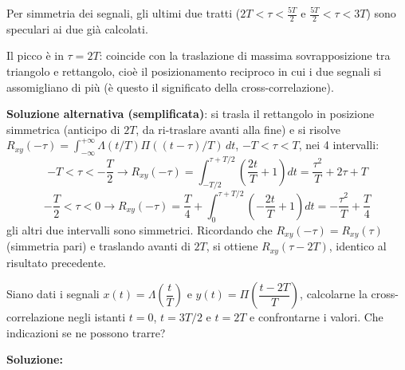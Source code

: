 \documentclass[12pt, a4paper]{article}
\begin{document}
Per simmetria dei segnali, gli ultimi due tratti ($2T<\tau<\frac{5T}2$ e $\frac{5T}2<\tau<3T$) sono speculari ai due già calcolati.

\begin{center}
\end{center}

Il picco è in $\tau=2T$: coincide con la traslazione di massima sovrapposizione tra triangolo e rettangolo, cioè il posizionamento reciproco in cui i due segnali si assomigliano di più (è questo il significato della cross-correlazione).

\textbf{Soluzione alternativa (semplificata)}: si trasla il rettangolo in posizione simmetrica (anticipo di $2T$, da ri-traslare avanti alla fine) e si risolve $R_{xy}(-\tau)=\int_{-\infty}^{+\infty}\Lambda(t/T)\Pi((t-\tau)/T)\,dt$, $-T<\tau<T$, nei 4 intervalli:
$$-T<\tau<-\frac T2 \to R_{xy}(-\tau)=\int_{-T/2}^{\tau+T/2}\left(\frac{2t}T+1\right)dt = \frac{\tau^2}T+2\tau+T$$
$$-\frac T2<\tau<0 \to R_{xy}(-\tau)=\frac T4+\int_0^{\tau+T/2}\left(-\frac{2t}T+1\right)dt = -\frac{\tau^2}T+\frac T4$$
gli altri due intervalli sono simmetrici. Ricordando che $R_{xy}(-\tau)=R_{xy}(\tau)$ (simmetria pari) e traslando avanti di $2T$, si ottiene $R_{xy}(\tau-2T)$, identico al risultato precedente.

\bigskip

\begin{tcolorbox}[colback=lightergray!10, colframe=tocsec, title=\textbf{Esercizio 7bis (versione semplificata del 7)}]
Siano dati i segnali $x(t)=\Lambda\!\left(\dfrac tT\right)$ e $y(t)=\Pi\!\left(\dfrac{t-2T}{T}\right)$, calcolarne la cross-correlazione negli istanti $t=0$, $t=3T/2$ e $t=2T$ e confrontarne i valori. Che indicazioni se ne possono trarre?
\end{tcolorbox}

\textbf{Soluzione:}
\end{document}
